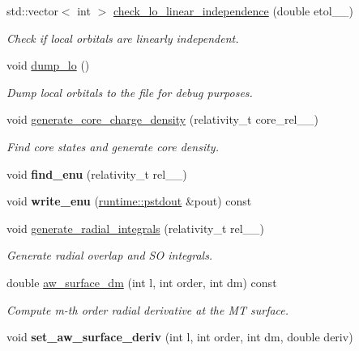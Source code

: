 \begin{DoxyCompactItemize}
\item 
std\+::vector$<$ int $>$ \hyperlink{classsirius_1_1_atom__symmetry__class_aff6a257253ffda866c1dc0b43aa5f711}{check\+\_\+lo\+\_\+linear\+\_\+independence} (double etol\+\_\+\+\_\+)
\begin{DoxyCompactList}\small\item\em Check if local orbitals are linearly independent. \end{DoxyCompactList}\item 
void \hyperlink{classsirius_1_1_atom__symmetry__class_a1e0425a9395f4cf8cb5bf9e7ab4c2715}{dump\+\_\+lo} ()
\begin{DoxyCompactList}\small\item\em Dump local orbitals to the file for debug purposes. \end{DoxyCompactList}\item 
void \hyperlink{classsirius_1_1_atom__symmetry__class_a310cc6236763404b713e590f5d8cb4eb}{generate\+\_\+core\+\_\+charge\+\_\+density} (relativity\+\_\+t core\+\_\+rel\+\_\+\+\_\+)
\begin{DoxyCompactList}\small\item\em Find core states and generate core density. \end{DoxyCompactList}\item 
\hypertarget{classsirius_1_1_atom__symmetry__class_a9424f05dd381c4ecc0513241883eaee2}{}void {\bfseries find\+\_\+enu} (relativity\+\_\+t rel\+\_\+\+\_\+)\label{classsirius_1_1_atom__symmetry__class_a9424f05dd381c4ecc0513241883eaee2}

\item 
\hypertarget{classsirius_1_1_atom__symmetry__class_aa686b4e8a837309eb43159609ffe3e61}{}void {\bfseries write\+\_\+enu} (\hyperlink{classruntime_1_1pstdout}{runtime\+::pstdout} \&pout) const \label{classsirius_1_1_atom__symmetry__class_aa686b4e8a837309eb43159609ffe3e61}

\item 
void \hyperlink{classsirius_1_1_atom__symmetry__class_adbc3da5557dd7d08b3c8eeb80c92785f}{generate\+\_\+radial\+\_\+integrals} (relativity\+\_\+t rel\+\_\+\+\_\+)
\begin{DoxyCompactList}\small\item\em Generate radial overlap and S\+O integrals. \end{DoxyCompactList}\item 
double \hyperlink{classsirius_1_1_atom__symmetry__class_a3becc8c8883e2094c732c2f8bf2748e5}{aw\+\_\+surface\+\_\+dm} (int l, int order, int dm) const 
\begin{DoxyCompactList}\small\item\em Compute m-\/th order radial derivative at the M\+T surface. \end{DoxyCompactList}\item 
\hypertarget{classsirius_1_1_atom__symmetry__class_a7d1134018dcfb903e3d5f4ebc365cb4c}{}void {\bfseries set\+\_\+aw\+\_\+surface\+\_\+deriv} (int l, int order, int dm, double deriv)\label{classsirius_1_1_atom__symmetry__class_a7d1134018dcfb903e3d5f4ebc365cb4c}


\end{DoxyCompactItemize}
